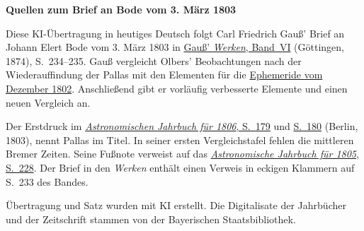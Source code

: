 \clearpage\thispagestyle{empty}
\begin{center}\textbf{Quellen zum Brief an Bode vom 3. März 1803}\end{center}
\noindent Diese KI-Übertragung in heutiges Deutsch folgt Carl Friedrich Gauß’ Brief an Johann Elert Bode vom 3. März 1803 in \href{https://gdz.sub.uni-goettingen.de/id/PPN236007467}{Gauß’ \textit{Werken}, Band~VI} (Göttingen, 1874), S.~234--235. Gauß vergleicht Olbers’ Beobachtungen nach der Wiederauffindung der Pallas mit den Elementen für die \href{https://api.digitale-sammlungen.de/iiif/image/v2/bsb10538598_00597/full/1450,/0/default.jpg}{Ephemeride vom Dezember 1802}. Anschließend gibt er vorläufig verbesserte Elemente und einen neuen Vergleich an.
\par\smallskip\noindent Der Erstdruck im \href{https://api.digitale-sammlungen.de/iiif/image/v2/bsb10538335_00189/full/1450,/0/default.jpg}{\textit{Astronomischen Jahrbuch für 1806}, S.~179} und \href{https://api.digitale-sammlungen.de/iiif/image/v2/bsb10538335_00190/full/1450,/0/default.jpg}{S.~180} (Berlin, 1803), nennt Pallas im Titel. In seiner ersten Vergleichstafel fehlen die mittleren Bremer Zeiten. Seine Fußnote verweist auf das \href{https://api.digitale-sammlungen.de/iiif/image/v2/bsb10538334_00238/full/1450,/0/default.jpg}{\textit{Astronomische Jahrbuch für 1805}, S.~228}. Der Brief in den \textit{Werken} enthält einen Verweis in eckigen Klammern auf S.~233 des Bandes.
\par\smallskip\noindent Übertragung und Satz wurden mit KI erstellt. Die Digitalisate der Jahrbücher und der Zeitschrift stammen von der Bayerischen Staatsbibliothek.
\clearpage
